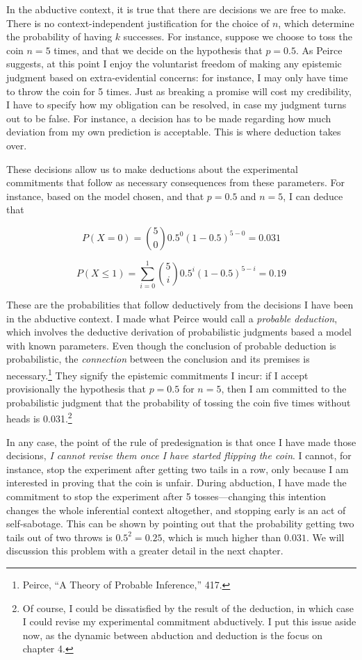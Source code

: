 In the abductive context, it is true that there are decisions we are
free to make. There is no context-independent justification for the
choice of \(n\), which determine the probability of having \(k\)
successes. For instance, suppose we choose to toss the coin \(n=5\)
times, and that we decide on the hypothesis that \(p=0.5\). As Peirce
suggests, at this point I enjoy the voluntarist freedom of making any
epistemic judgment based on extra-evidential concerns: for instance, I
may only have time to throw the coin for 5 times. Just as breaking a
promise will cost my credibility, I have to specify how my obligation
can be resolved, in case my judgment turns out to be false. For
instance, a decision has to be made regarding how much deviation from my
own prediction is acceptable. This is where deduction takes over.

These decisions allow us to make deductions about the experimental
commitments that follow as necessary consequences from these parameters.
For instance, based on the model chosen, and that \(p=0.5\) and \(n=5\),
I can deduce that

\[P(X=0) = {5 \choose 0} 0.5^0 (1-0.5)^{5-0} = 0.031\]

\[P(X\leq 1) = \sum_{i=0}^1 {5 \choose i } 0.5^i (1-0.5)^{5-i} = 0.19\]

These are the probabilities that follow deductively from the decisions I
have been in the abductive context. I made what Peirce would call a
\emph{probable deduction}, which involves the deductive derivation of
probabilistic judgments based a model with known parameters. Even though
the conclusion of probable deduction is probabilistic, the
\emph{connection} between the conclusion and its premises is
necessary.\footnote{Peirce, ``A Theory of Probable Inference,'' 417.}
They signify the epistemic commitments I incur: if I accept
provisionally the hypothesis that \(p=0.5\) for \(n=5\), then I am
committed to the probabilistic judgment that the probability of tossing
the coin five times without heads is 0.031.\footnote{Of course, I could
  be dissatisfied by the result of the deduction, in which case I could
  revise my experimental commitment abductively. I put this issue aside
  now, as the dynamic between abduction and deduction is the focus on
  chapter 4.}

In any case, the point of the rule of predesignation is that once I have
made those decisions, \emph{I cannot revise them once I have started
flipping the coin}. I cannot, for instance, stop the experiment after
getting two tails in a row, only because I am interested in proving that
the coin is unfair. During abduction, I have made the commitment to stop
the experiment after 5 tosses---changing this intention changes the
whole inferential context altogether, and stopping early is an act of
self-sabotage. This can be shown by pointing out that the probability
getting two tails out of two throws is \(0.5^2 = 0.25\), which is much
higher than \(0.031\). We will discussion this problem with a greater
detail in the next chapter.

